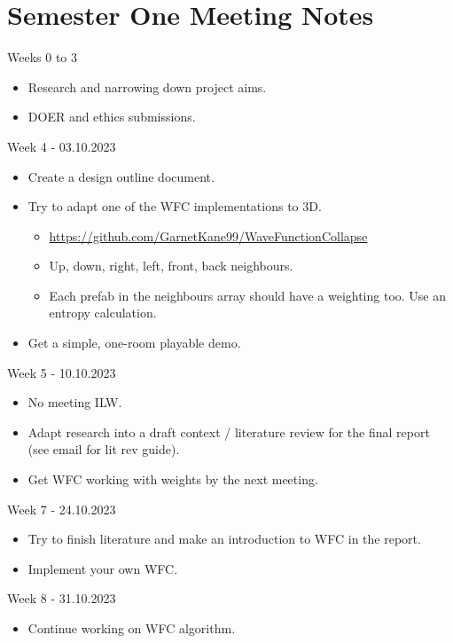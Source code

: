 \section{Semester One Meeting Notes}
\label{sec:semester_one_meeting_notes}
\noindent Weeks 0 to 3
\begin{itemize}
    \item Research and narrowing down project aims.
    \item DOER and ethics submissions.
\end{itemize}
\noindent Week 4 - 03.10.2023
\begin{itemize}
    \item Create a design outline document.
    \item Try to adapt one of the WFC implementations to 3D.
          \begin{itemize}
              \item \url{https://github.com/GarnetKane99/WaveFunctionCollapse}
              \item Up, down, right, left, front, back neighbours.
              \item Each prefab in the neighbours array should have a weighting too. Use an entropy calculation.
          \end{itemize}
    \item Get a simple, one-room playable demo.
\end{itemize}

\noindent Week 5 - 10.10.2023
\begin{itemize}
    \item No meeting ILW.
    \item Adapt research into a draft context / literature review for the final report (see email for lit rev guide).
    \item Get WFC working with weights by the next meeting.
\end{itemize}

\noindent Week 7 - 24.10.2023
\begin{itemize}
    \item Try to finish literature and make an introduction to WFC in the report.
    \item Implement your own WFC.
\end{itemize}

\noindent Week 8 - 31.10.2023
\begin{itemize}
    \item Continue working on WFC algorithm.
\end{itemize}


